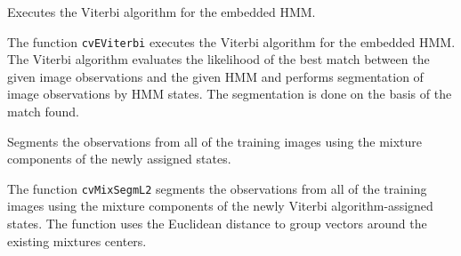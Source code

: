 
Executes the Viterbi algorithm for the embedded HMM.


\begin{description}
\end{description}

The function \texttt{cvEViterbi} executes the Viterbi algorithm for the embedded HMM. The Viterbi algorithm evaluates the likelihood of the best match between the given image observations and the given HMM and performs segmentation of image observations by HMM states. The segmentation is done on the basis of the match found.


Segments the observations from all of the training images using the mixture components of the newly assigned states.


\begin{description}
\end{description}

The function \texttt{cvMixSegmL2} segments the observations from all of the training images using the mixture components of the newly Viterbi algorithm-assigned states. The function uses the Euclidean distance to group vectors around the existing mixtures centers.

